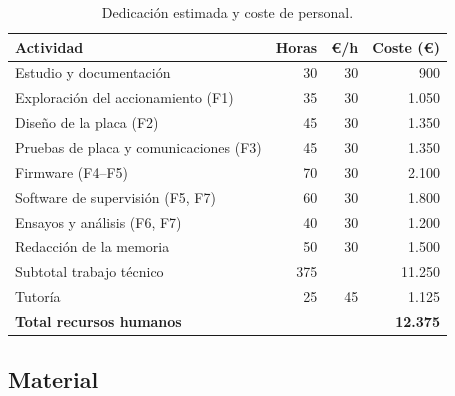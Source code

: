 \begin{table}[H]
\centering
\caption{Dedicación estimada y coste de personal.}
\label{tab:horas}
\begin{tabular}{@{}lrrr@{}}
\toprule
Actividad & Horas & €/h & Coste (€) \\
\midrule
Estudio y documentación & 30 & 30 & 900 \\
Exploración del accionamiento (F1) & 35 & 30 & 1.050 \\
Diseño de la placa (F2) & 45 & 30 & 1.350 \\
Pruebas de placa y comunicaciones (F3) & 45 & 30 & 1.350 \\
Firmware (F4--F5) & 70 & 30 & 2.100 \\
Software de supervisión (F5, F7) & 60 & 30 & 1.800 \\
Ensayos y análisis (F6, F7) & 40 & 30 & 1.200 \\
Redacción de la memoria & 50 & 30 & 1.500 \\
\midrule
Subtotal trabajo técnico & 375 & & 11.250 \\
Tutoría & 25 & 45 & 1.125 \\
\midrule
\textbf{Total recursos humanos} & & & \textbf{12.375} \\
\bottomrule
\end{tabular}
\end{table}

\subsection{Material}

